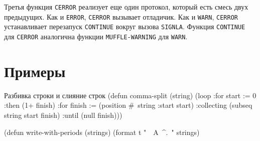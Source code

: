 Третья функция \lstinline{CERROR} реализует еще один протокол, который есть смесь двух предыдущих. Как и \lstinline{ERROR}, \lstinline{CERROR} вызывает отладичик. Как и \lstinline{WARN}, \lstinline{CERROR} устанавливает перезапуск \lstinline{CONTINUE} вокруг вызова \lstinline{SIGNLA}. Функция \lstinline{CONTINUE} для \lstinline{CERROR} аналогична функции \lstinline{MUFFLE-WARNING} для \lstinline{WARN}.

\section{Примеры}
\begin{cllst}{Разбивка строки и слияние строк}{}
(defun comma-split (string)
  (loop :for start := 0 :then (1+ finish)
        :for finish := (position #\, string :start start)
        :collecting (subseq string start finish)
        :until (null finish)))

(defun write-with-periods (strings)
  (format t "~{~A~^.~}" strings)
\end{cllst}

